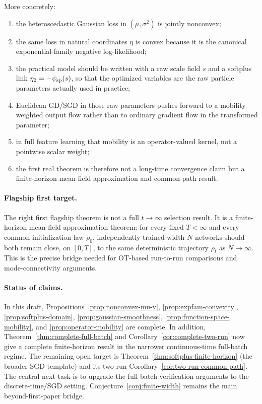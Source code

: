 \documentclass[11pt]{article}
\theoremstyle{definition}
\begin{document}
More concretely:
\begin{enumerate}[label=(\roman*)]
  \item the heteroscedastic Gaussian loss in $(\mu,\sigma^2)$ is jointly
  nonconvex;
  \item the same loss in natural coordinates $\eta$ is convex because it is the
  canonical exponential-family negative log-likelihood;
  \item the practical model should be written with a raw scale field $s$ and a
  softplus link $\eta_2=-\psi_{\rm sp}(s)$, so that the optimized variables are
  the raw particle parameters actually used in practice;
  \item Euclidean GD/SGD in those raw parameters pushes forward to a
  mobility-weighted output flow rather than to ordinary gradient flow in the
  transformed parameter;
  \item in full feature learning that mobility is an operator-valued kernel,
  not a pointwise scalar weight;
  \item the first real theorem is therefore not a long-time convergence claim
  but a finite-horizon mean-field approximation and common-path result.
\end{enumerate}

\paragraph{Flagship first target.}
The right first flagship theorem is not a full $t\to\infty$ selection result.
It is a finite-horizon mean-field approximation theorem: for every fixed
$T<\infty$ and every common initialization law $\rho_0$, independently trained
width-$N$ networks should both remain close, on $[0,T]$, to the same
deterministic trajectory $\rho_t$ as $N\to\infty$. This is the precise bridge
needed for OT-based run-to-run comparisons and mode-connectivity arguments.

\paragraph{Status of claims.}
In this draft, Propositions~\ref{prop:nonconvex-mu-v},
\ref{prop:expfam-convexity}, \ref{prop:softplus-domain},
\ref{prop:gaussian-smoothness}, \ref{prop:function-space-mobility}, and
\ref{prop:operator-mobility} are complete. In addition,
Theorem~\ref{thm:complete-full-batch} and
Corollary~\ref{cor:complete-two-run} now give a complete finite-horizon result
in the narrower continuous-time full-batch regime. The remaining open target is
Theorem~\ref{thm:softplus-finite-horizon} (the broader SGD template) and its
two-run Corollary~\ref{cor:two-run-common-path}. The central next task is to
upgrade the full-batch verification arguments to the discrete-time/SGD setting.
Conjecture~\ref{conj:finite-width} remains the main beyond-first-paper bridge.
\end{document}
